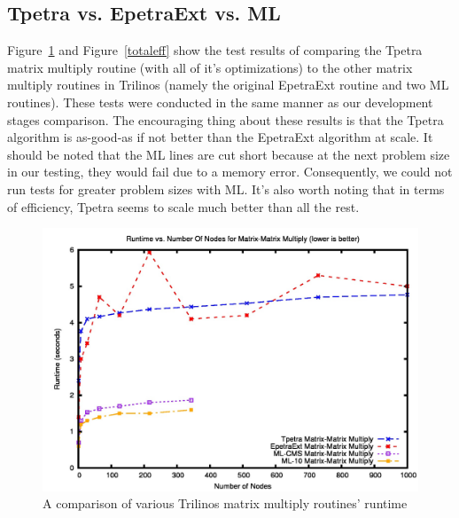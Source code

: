 \documentclass{article}
\begin{document}
\subsection{Tpetra vs. EpetraExt vs. ML}
Figure~\ref{totaltime} and Figure~\ref{totaleff} show the test results of comparing the Tpetra matrix multiply routine 
(with all of it's optimizations) to the other matrix multiply routines in Trilinos (namely the original EpetraExt 
routine and two ML routines). These tests were conducted in the same manner as our development stages comparison. 
The encouraging thing about these results is that the Tpetra algorithm is as-good-as if not better than the EpetraExt 
algorithm at scale. It should be noted that the ML lines are cut short because at the next problem size in our testing, 
they would fail due to a memory error. Consequently, we could not run tests for greater problem sizes with ML. 
It's also worth noting that in terms of efficiency, Tpetra seems to scale much better than all the rest.

\begin{figure}
\includegraphics[scale=.4]{totaltime.jpg}
\caption[Time Comparison]{A comparison of various Trilinos matrix multiply routines' runtime}
\label{totaltime}
\end{figure}
\end{document}
